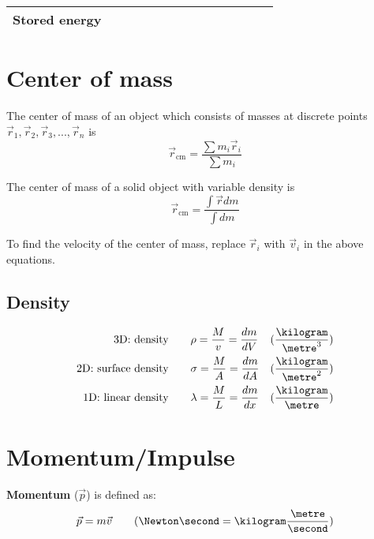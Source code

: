 \begin{tabular}{|>{\RaggedRight}p{0.38225\linewidth}|>{\RaggedRight}p{0.23286\linewidth}|>{\RaggedRight}p{0.23286\linewidth}|}
	\\ \hline \hspace*{0pt}\ignorespaces{}\hspace*{0pt}Stored energy&\hspace*{0pt}\ignorespaces{}\hspace*{0pt}{${\displaystyle E_{\mathrm {eq} }=E_{1}+E_{2}}$}&\hspace*{0pt}\ignorespaces{}\hspace*{0pt}{${\displaystyle E_{\mathrm {eq} }=E_{1}+E_{2}}$}\\ \hline 
\end{tabular}

\section{Center of mass}

The center of mass of an object which consists of masses at discrete points $\vec{r}_1, \vec{r}_2, \vec{r}_3, ..., \vec{r}_n$ is
\[
	\vec{r}_\text{cm} = \frac{\sum m_i \vec{r}_i}{\sum m_i}
\]

The center of mass of a solid object with variable density is
\[
	\vec{r}_\text{cm} = \frac{\int \vec{r} dm}{\int dm}
\]

To find the velocity of the center of mass, replace $\vec{r}_i$ with $\vec{v}_i$ in the above equations.

\subsection{Density}

\begin{align*}
	\text{3D: density} \qquad & \rho = \frac{M}{v} = \frac{dm}{dV} & (\frac{\kilogram}{\metre^3}) \\
	\text{2D: surface density} \qquad & \sigma = \frac{M}{A} = \frac{dm}{dA} & (\frac{\kilogram}{\metre^2}) \\
	\text{1D: linear density} \qquad & \lambda = \frac{M}{L} = \frac{dm}{dx} & (\frac{\kilogram}{\metre}) \\
\end{align*}

\section{Momentum/Impulse}

\begin{definition}[Momentum] \textbf{Momentum} ($\vec{p}$) is defined as:
	\[
		\vec{p} = m \vec{v} \qquad (\Newton \second = \kilogram \frac{\metre}{\second})
	\]
\end{definition}

